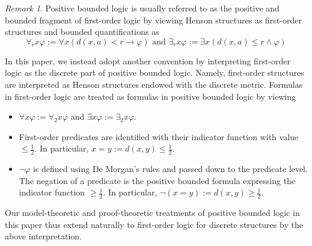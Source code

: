 \documentclass[11pt]{amsart}
\theoremstyle{definition}
\theoremstyle{remark}
\newtheorem{remark}[theorem]{Remark}
\begin{document}
\begin{remark}
Positive bounded logic is usually referred to as the positive and bounded fragment of first-order logic by viewing Henson structures as first-order structures and bounded quantifications as 
$$\forall_rx\varphi:=\forall x(d(x,a)< r\to \varphi)\text{ and } \exists_rx\varphi:=\exists x(d(x,a)\leq  r\wedge \varphi)$$

In this paper, we instead adopt another convention by interpreting first-order logic as the discrete part of positive bounded logic. Namely, first-order structures are interpreted as Henson structures endowed with the discrete metric. Formulas in first-order logic are treated as formulas in positive bounded logic by viewing 
\begin{itemize}
    \item $\forall x\varphi:=\forall_2x\varphi$ and $\exists x\varphi:=\exists_2x\varphi$.
    \item First-order predicates are identified with their indicator function with value $\leq \frac{1}{2}$. In particular, $x=y:=d(x,y)\leq \frac{1}{2}$.
    \item $\neg \varphi$ is defined using De Morgan's rules and passed down to the predicate level. The negation of a predicate is the positive bounded formula expressing the indicator function $\geq \frac{1}{2}$. In particular, $\neg(x=y):=d(x,y)\geq \frac{1}{2}$.
\end{itemize}
Our model-theoretic and proof-theoretic treatments of positive bounded logic in this paper thus extend naturally to first-order logic for discrete structures by the above interpretation. 
\end{remark}
\end{document}
